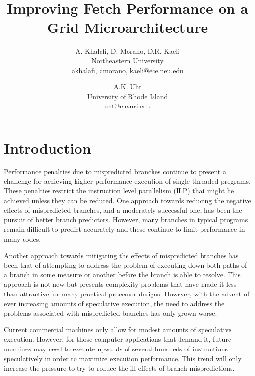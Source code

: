 \documentclass[10pt,dvips]{article}
\begin{document}
\parskip 2mm
%
%
\title{Improving Fetch Performance on a Grid Microarchitecture}
%
\author{
A. Khalafi, D. Morano, D.R. Kaeli\\
Northeastern University\\
{akhalafi, dmorano, kaeli}@ece.neu.edu\\
\and
A.K. Uht\\
University of Rhode Island\\ 
uht@ele.uri.edu
}
%
\maketitle
%
\begin{abstract}

\end{abstract}
%
%
\section{Introduction}
%
Performance penalties due to mispredicted branches continue to
present a challenge for achieving higher performance execution
of single threaded programs.
These penalties restrict the instruction level parallelism (ILP)
that might be achieved unless they can be reduced.
One approach towards reducing the negative effects of mispredicted
branches, and a moderately successful one, has been the pursuit
of better branch predictors.  However, many branches in typical
programs remain difficult to predict accurately and these continue
to limit performance in many codes.

Another approach towards mitigating the effects of mispredicted branches
has been that of attempting to address the problem of executing
down both paths of a branch in some measure or another before the
branch is able to resolve.  This approach is not new but presents
complexity problems that have made it less than attractive for
many practical processor designs.  However, with the advent of ever
increasing amounts of speculative execution, the need to address
the problems associated with mispredicted branches has only grown worse.

Current commercial machines only allow for modest
amounts of speculative execution.
However, for those computer applications that demand it,
future machines may need to execute upwards of
several hundreds of instructions speculatively in order to maximize
execution performance.  This trend will only increase the pressure to try
to reduce the ill effects of branch mispredictions.
\end{document}

